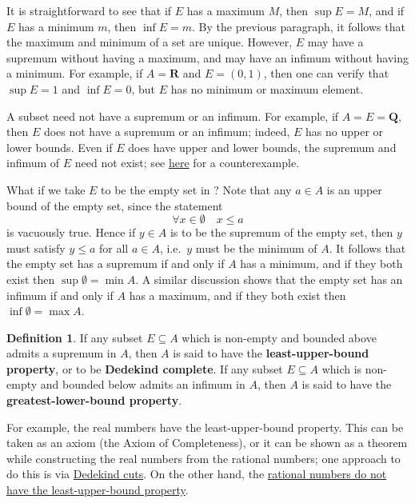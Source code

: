 \documentclass[12pt]{article}
\theoremstyle{definition}
\newtheorem{definition}{Definition}[section]
\newcommand{\Q}{\mathbf{Q}}
\newcommand{\R}{\mathbf{R}}
\begin{document}
It is straightforward to see that if \( E \) has a maximum \( M \), then \( \sup E = M \), and if \( E \) has a minimum \( m \), then \( \inf E = m \). By the previous paragraph, it follows that the maximum and minimum of a set are unique. However, \( E \) may have a supremum without having a maximum, and may have an infimum without having a minimum. For example, if \( A = \R \) and \( E = (0, 1) \), then one can verify that \( \sup E = 1 \) and \( \inf E = 0 \), but \( E \) has no minimum or maximum element.

A subset need not have a supremum or an infimum. For example, if \( A = E = \Q \), then \( E \) does not have a supremum or an infimum; indeed, \( E \) has no upper or lower bounds. Even if \( E \) does have upper and lower bounds, the supremum and infimum of \( E \) need not exist; see \href{https://lew98.github.io/Mathematics/Q_does_not_have_the_least_upper_bound_property.pdf}{here} for a counterexample.

What if we take \( E \) to be the empty set in ? Note that any \( a \in A \) is an upper bound of the empty set, since the statement
\[
    \forall x \in \emptyset \quad x \leq a
\]
is vacuously true. Hence if \( y \in A \) is to be the supremum of the empty set, then \( y \) must satisfy \( y \leq a \) for all \( a \in A \), i.e.\ \( y \) must be the minimum of \( A \). It follows that the empty set has a supremum if and only if \( A \) has a minimum, and if they both exist then \( \sup \emptyset = \min A \). A similar discussion shows that the empty set has an infimum if and only if \( A \) has a maximum, and if they both exist then \( \inf \emptyset = \max A \).

\begin{definition}
\label{def:lub_glb_properties}
    If any subset \( E \subseteq A \) which is non-empty and bounded above admits a supremum in \( A \), then \( A \) is said to have the \textbf{least-upper-bound property}, or to be \textbf{Dedekind complete}. If any subset \( E \subseteq A \) which is non-empty and bounded below admits an infimum in \( A \), then \( A \) is said to have the \textbf{greatest-lower-bound property}.
\end{definition}

For example, the real numbers have the least-upper-bound property. This can be taken as an axiom (the Axiom of Completeness), or it can be shown as a theorem while constructing the real numbers from the rational numbers; one approach to do this is via \href{https://lew98.github.io/Mathematics/Construction_of_R_from_Q_via_Dedekind_cuts.pdf}{Dedekind cuts}. On the other hand, the \href{https://lew98.github.io/Mathematics/Q_does_not_have_the_least_upper_bound_property.pdf}{rational numbers do not have the least-upper-bound property}.
\end{document}
